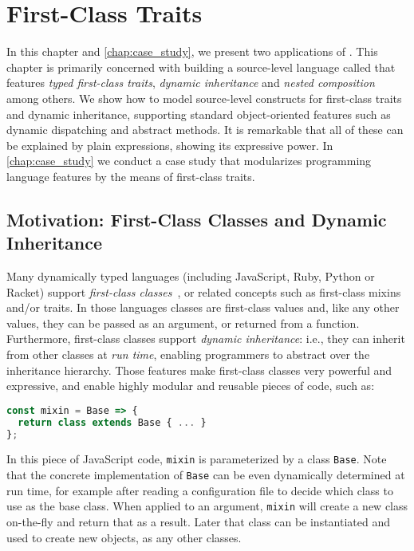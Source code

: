 

\renewcommand\ottaltinferrule[4]{
  \inferrule*[narrower=0.9,lab=#1,#2]
    {#3}
    {#4}
}

\chapter{First-Class Traits}
\label{chap:traits}


In this chapter and \cref{chap:case_study}, we present two applications of
\fnamee. This chapter is primarily concerned with building a source-level
language called \sedel that features \emph{typed first-class traits},
\emph{dynamic inheritance} and \emph{nested composition} among others. We show
how to model source-level constructs for first-class traits and dynamic
inheritance, supporting standard object-oriented features such as dynamic
dispatching and abstract methods. It is remarkable that all of these can be
explained by plain \fnamee expressions, showing its expressive power. In
\cref{chap:case_study} we conduct a case study that modularizes programming
language features by the means of first-class traits.



\section{Motivation: First-Class Classes and Dynamic Inheritance}

Many dynamically typed languages (including JavaScript, Ruby, Python
or Racket) support \emph{first-class classes}~\citep{DBLP:conf/aplas/FlattFF06}, or related concepts
such as first-class mixins and/or traits. In those languages classes
are first-class values and, like any other values, they can be
passed as an argument, or returned from a function. Furthermore,
first-class classes support \emph{dynamic inheritance}: i.e., they
can inherit from other classes at \emph{run time}, enabling
programmers to abstract over the inheritance hierarchy.
Those features make first-class classes very powerful and expressive,
and enable highly modular and reusable pieces of code, such as:
\begin{lstlisting}[language=JavaScript]
const mixin = Base => {
  return class extends Base { ... }
};
\end{lstlisting}
In this piece of JavaScript code, \lstinline{mixin} is
parameterized by a class \lstinline{Base}. Note that the concrete
implementation of \lstinline{Base} can be
even dynamically determined at run time, for example
after reading a configuration file to decide which
class to use as the base class.  When applied to an argument,
\lstinline{mixin} will create a new class on-the-fly and return that
as a result. Later that class can be instantiated and used to create
new objects, as any other classes.

